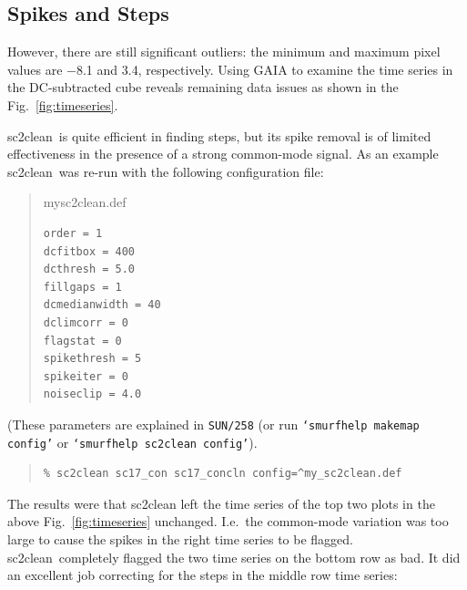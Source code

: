 \documentclass[twoside,11pt]{article}
\newcommand{\xref}[3]{#1}
\newcommand{\xlabel}[1]{}
\renewcommand{\_}{\texttt{\symbol{95}}}
\newenvironment{myquote}{\begin{quote}\begin{small}}{\end{small}\end{quote}}
\newcommand{\task}[1]{\textsf{#1}}
\newcommand{\clean}{\xref{\task{sc2clean}}{sun258}{SC2CLEAN}}
\begin{document}
\subsection{\xlabel{spikesteps}Spikes and Steps}
\label{sec:spikesteps}

However, there are still significant outliers: the minimum and maximum
pixel values are $-$8.1 and 3.4, respectively. Using GAIA to examine 
the time series in the DC-subtracted cube reveals remaining data issues as
shown in the Fig.~\ref{fig:timeseries}.

\clean\  is quite efficient in finding steps, but its spike removal is
of limited effectiveness in the presence of a strong common-mode
signal.  As an example \clean\  was re-run with the following
configuration file: 

\begin{myquote}
my\_sc2clean.def
\begin{verbatim}
order = 1
dcfitbox = 400
dcthresh = 5.0
fillgaps = 1
dcmedianwidth = 40
dclimcorr = 0
flagstat = 0
spikethresh = 5
spikeiter = 0
noiseclip = 4.0
\end{verbatim}
\end{myquote}


(These parameters are explained in \texttt{SUN/258} (or run
\texttt{`smurfhelp makemap config'} or \texttt{`smurfhelp sc2clean
config'}).

\begin{myquote}
\begin{verbatim}
% sc2clean sc17_con sc17_concln config=^my_sc2clean.def
\end{verbatim}
\end{myquote}

The results were that sc2clean left the time series of the top two
plots in the above Fig.~\ref{fig:timeseries} unchanged. I.e.\ the
common-mode variation was too large to cause the spikes in the right
time series to be flagged. \clean\  completely flagged the two time
series on the bottom row as bad. It did an excellent job correcting
for the steps in the middle row time series:
\end{document}
